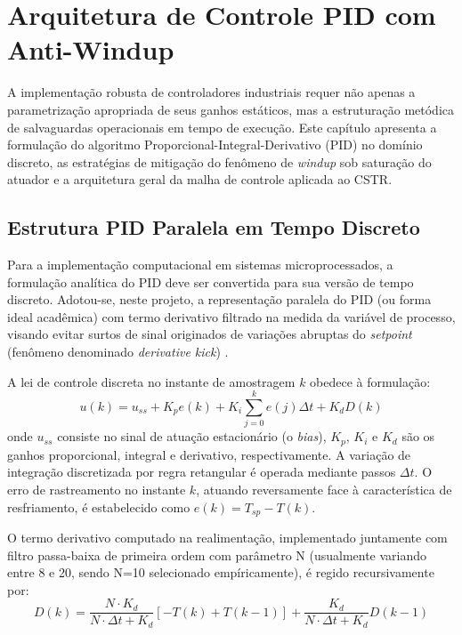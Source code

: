\chapter{Arquitetura de Controle PID com Anti-Windup}
\label{cap:arquitetura_pid}

A implementação robusta de controladores industriais requer não apenas a parametrização apropriada de seus ganhos estáticos, mas a estruturação metódica de salvaguardas operacionais em tempo de execução. Este capítulo apresenta a formulação do algoritmo Proporcional-Integral-Derivativo (PID) no domínio discreto, as estratégias de mitigação do fenômeno de \textit{windup} sob saturação do atuador e a arquitetura geral da malha de controle aplicada ao CSTR.

\section{Estrutura PID Paralela em Tempo Discreto}
\label{sec:pid_discreto}

Para a implementação computacional em sistemas microprocessados, a formulação analítica do PID deve ser convertida para sua versão de tempo discreto. Adotou-se, neste projeto, a representação paralela do PID (ou forma ideal acadêmica) com termo derivativo filtrado na medida da variável de processo, visando evitar surtos de sinal originados de variações abruptas do \textit{setpoint} (fenômeno denominado \textit{derivative kick}) \cite{Seborg2016, Astrom2006}.

A lei de controle discreta no instante de amostragem $k$ obedece à formulação:
\begin{equation}
    u(k) = u_{ss} + K_p e(k) + K_i \sum_{j=0}^{k} e(j)\Delta t + K_d D(k)
\end{equation}
onde $u_{ss}$ consiste no sinal de atuação estacionário (o \textit{bias}), $K_p$, $K_i$ e $K_d$ são os ganhos proporcional, integral e derivativo, respectivamente. A variação de integração discretizada por regra retangular é operada mediante passos $\Delta t$. O erro de rastreamento no instante $k$, atuando reversamente face à característica de resfriamento, é estabelecido como $e(k) = T_{sp} - T(k)$.

O termo derivativo computado na realimentação, implementado juntamente com filtro passa-baixa de primeira ordem com parâmetro N (usualmente variando entre 8 e 20, sendo N=10 selecionado empíricamente), é regido recursivamente por:
\begin{equation}
    D(k) = \frac{N \cdot K_d}{N \cdot \Delta t + K_d} \left[-T(k) + T(k-1)\right] + \frac{K_d}{N \cdot \Delta t + K_d} D(k-1)
\end{equation}

